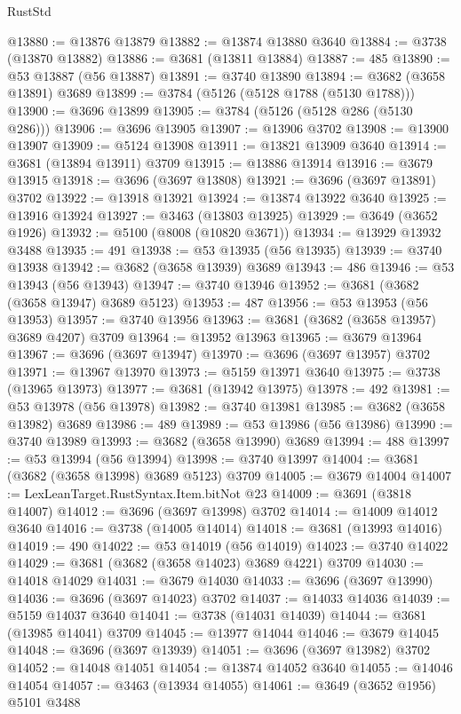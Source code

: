 \begin{lexlean}{RustStd}
\begin{coremodule}
@13880 := @13876 @13879
@13882 := @13874 @13880 @3640
@13884 := @3738 (@13870 @13882)
@13886 := @3681 (@13811 @13884)
@13887 := 485
@13890 := @53 @13887 (@56 @13887)
@13891 := @3740 @13890
@13894 := @3682 (@3658 @13891) @3689
@13899 := @3784 (@5126 (@5128 @1788 (@5130 @1788)))
@13900 := @3696 @13899
@13905 := @3784 (@5126 (@5128 @286 (@5130 @286)))
@13906 := @3696 @13905
@13907 := @13906 @3702
@13908 := @13900 @13907
@13909 := @5124 @13908
@13911 := @13821 @13909 @3640
@13914 := @3681 (@13894 @13911) @3709
@13915 := @13886 @13914
@13916 := @3679 @13915
@13918 := @3696 (@3697 @13808)
@13921 := @3696 (@3697 @13891) @3702
@13922 := @13918 @13921
@13924 := @13874 @13922 @3640
@13925 := @13916 @13924
@13927 := @3463 (@13803 @13925)
@13929 := @3649 (@3652 @1926)
@13932 := @5100 (@8008 (@10820 @3671))
@13934 := @13929 @13932 @3488
@13935 := 491
@13938 := @53 @13935 (@56 @13935)
@13939 := @3740 @13938
@13942 := @3682 (@3658 @13939) @3689
@13943 := 486
@13946 := @53 @13943 (@56 @13943)
@13947 := @3740 @13946
@13952 := @3681 (@3682 (@3658 @13947) @3689 @5123)
@13953 := 487
@13956 := @53 @13953 (@56 @13953)
@13957 := @3740 @13956
@13963 := @3681 (@3682 (@3658 @13957) @3689 @4207) @3709
@13964 := @13952 @13963
@13965 := @3679 @13964
@13967 := @3696 (@3697 @13947)
@13970 := @3696 (@3697 @13957) @3702
@13971 := @13967 @13970
@13973 := @5159 @13971 @3640
@13975 := @3738 (@13965 @13973)
@13977 := @3681 (@13942 @13975)
@13978 := 492
@13981 := @53 @13978 (@56 @13978)
@13982 := @3740 @13981
@13985 := @3682 (@3658 @13982) @3689
@13986 := 489
@13989 := @53 @13986 (@56 @13986)
@13990 := @3740 @13989
@13993 := @3682 (@3658 @13990) @3689
@13994 := 488
@13997 := @53 @13994 (@56 @13994)
@13998 := @3740 @13997
@14004 := @3681 (@3682 (@3658 @13998) @3689 @5123) @3709
@14005 := @3679 @14004
@14007 := LexLeanTarget.RustSyntax.Item.bitNot @23
@14009 := @3691 (@3818 @14007)
@14012 := @3696 (@3697 @13998) @3702
@14014 := @14009 @14012 @3640
@14016 := @3738 (@14005 @14014)
@14018 := @3681 (@13993 @14016)
@14019 := 490
@14022 := @53 @14019 (@56 @14019)
@14023 := @3740 @14022
@14029 := @3681 (@3682 (@3658 @14023) @3689 @4221) @3709
@14030 := @14018 @14029
@14031 := @3679 @14030
@14033 := @3696 (@3697 @13990)
@14036 := @3696 (@3697 @14023) @3702
@14037 := @14033 @14036
@14039 := @5159 @14037 @3640
@14041 := @3738 (@14031 @14039)
@14044 := @3681 (@13985 @14041) @3709
@14045 := @13977 @14044
@14046 := @3679 @14045
@14048 := @3696 (@3697 @13939)
@14051 := @3696 (@3697 @13982) @3702
@14052 := @14048 @14051
@14054 := @13874 @14052 @3640
@14055 := @14046 @14054
@14057 := @3463 (@13934 @14055)
@14061 := @3649 (@3652 @1956) @5101 @3488

\end{coremodule}
\end{lexlean}
